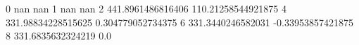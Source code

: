0 nan nan
1 nan nan
2 441.8961486816406 110.21258544921875
4 331.98834228515625 0.304779052734375
6 331.3440246582031 -0.33953857421875
8 331.6835632324219 0.0
